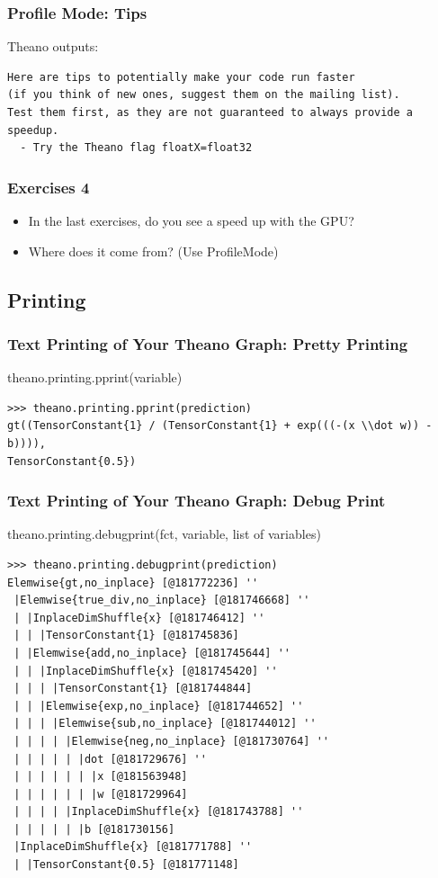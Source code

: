 \documentclass[a4paper,9pt]{beamer}
\begin{document}
\begin{frame}[fragile]
\frametitle{Profile Mode: Tips}
Theano outputs:
\vfill
\begin{Verbatim}
Here are tips to potentially make your code run faster
(if you think of new ones, suggest them on the mailing list).
Test them first, as they are not guaranteed to always provide a speedup.
  - Try the Theano flag floatX=float32
\end{Verbatim}
\end{frame}

\begin{frame}
\frametitle{Exercises 4}

\begin{itemize}
\item In the last exercises, do you see a speed up with the GPU?
\item Where does it come from? (Use ProfileMode)
\end{itemize}
\end{frame}


\subsection{Printing}
\begin{frame}[fragile]
\frametitle{Text Printing of Your Theano Graph: Pretty Printing}
theano.printing.pprint(variable)
\vfill
\begin{Verbatim}
>>> theano.printing.pprint(prediction)
gt((TensorConstant{1} / (TensorConstant{1} + exp(((-(x \\dot w)) - b)))),
TensorConstant{0.5})
\end{Verbatim}
\end{frame}


\begin{frame}[fragile]
\frametitle{Text Printing of Your Theano Graph: Debug Print}
theano.printing.debugprint({fct, variable, list of variables})
\vfill
\small
\begin{Verbatim}
>>> theano.printing.debugprint(prediction)
Elemwise{gt,no_inplace} [@181772236] ''   
 |Elemwise{true_div,no_inplace} [@181746668] ''   
 | |InplaceDimShuffle{x} [@181746412] ''   
 | | |TensorConstant{1} [@181745836]
 | |Elemwise{add,no_inplace} [@181745644] ''   
 | | |InplaceDimShuffle{x} [@181745420] ''   
 | | | |TensorConstant{1} [@181744844]
 | | |Elemwise{exp,no_inplace} [@181744652] ''   
 | | | |Elemwise{sub,no_inplace} [@181744012] ''   
 | | | | |Elemwise{neg,no_inplace} [@181730764] ''   
 | | | | | |dot [@181729676] ''   
 | | | | | | |x [@181563948]
 | | | | | | |w [@181729964]
 | | | | |InplaceDimShuffle{x} [@181743788] ''   
 | | | | | |b [@181730156]
 |InplaceDimShuffle{x} [@181771788] ''   
 | |TensorConstant{0.5} [@181771148]
\end{Verbatim}
\end{frame}
\end{document}
